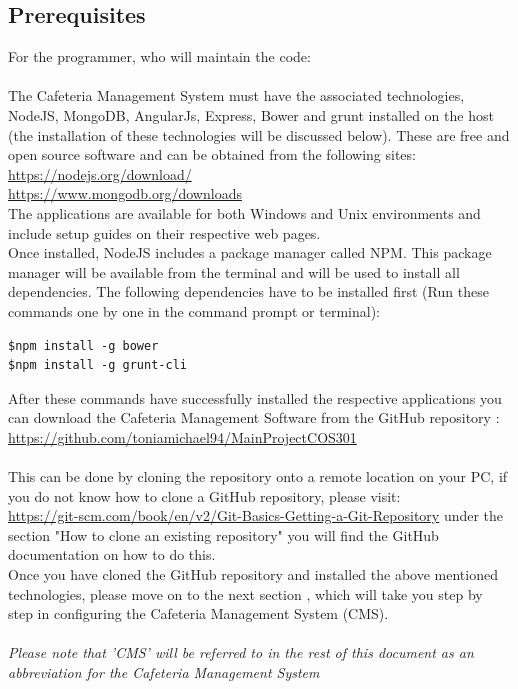 \documentclass[a4paper,12pt]{report}
\begin{document}
\subsection{Prerequisites}
For the programmer, who will maintain the code: \\ 
\\The  Cafeteria Management System must have the associated technologies, NodeJS, MongoDB, AngularJs, Express, Bower and grunt installed on the host (the installation of these technologies will be discussed below). These are free and open source software and can be obtained from the following sites:\\
\url{https://nodejs.org/download/} \\
\url{https://www.mongodb.org/downloads} \\
The applications are available for both Windows and Unix environments and include setup guides on their respective web pages.\\

Once installed, NodeJS includes a package manager called NPM. This package manager will be available from the terminal and will be used to install all dependencies. The following dependencies have to be installed first (Run these commands one by one in the command prompt or terminal):
\begin{verbatim}
$npm install -g bower
$npm install -g grunt-cli
\end{verbatim}

After these commands have successfully installed the respective applications you can download the Cafeteria Management Software from the GitHub repository :
 \url{https://github.com/toniamichael94/MainProjectCOS301}
\\ \\
This can be done by cloning the repository onto a remote location on your PC, if you do not know how to clone a GitHub repository, please visit:\\
  \url{https://git-scm.com/book/en/v2/Git-Basics-Getting-a-Git-Repository}  under the section "How to clone an existing repository" you will find the GitHub documentation on how to do this.
\\
Once you have cloned the GitHub repository and installed the above mentioned technologies, please move on to the next section , which will take you step by step in configuring the Cafeteria Management System (CMS).
\\ \\
{\em Please note that 'CMS' will be referred to in the rest of this document as an abbreviation for the Cafeteria Management System}
\end{document}
